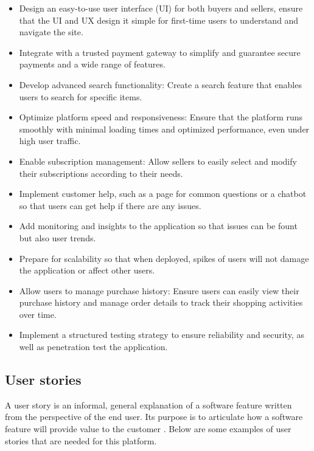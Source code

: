 \documentclass[]{project_report}
\begin{document}
\begin{itemize}
    \item Design an easy-to-use user interface (UI) for both buyers and sellers, ensure that the UI and UX design it simple for first-time users to understand and navigate the site.
    \item Integrate with a trusted payment gateway to simplify and guarantee secure payments and a wide range of features.
    \item Develop advanced search functionality: Create a search feature that enables users to search for specific items.
    \item Optimize platform speed and responsiveness: Ensure that the platform runs smoothly with minimal loading times and optimized performance, even under high user traffic.
    \item Enable subscription management: Allow sellers to easily select and modify their subscriptions according to their needs.
    \item Implement customer help, such as a page for common questions or a chatbot so that users can get help if there are any issues.
    \item Add monitoring and insights to the application so that issues can be fount but also user trends.
    \item Prepare for scalability so that when deployed, spikes of users will not damage the application or affect other users.
    \item Allow users to manage purchase history: Ensure users can easily view their purchase history and manage order details to track their shopping activities over time.
    \item Implement a structured testing strategy to ensure reliability and security, as well as penetration test the application.
\end{itemize}

\subsection{User stories}

A user story is an informal, general explanation of a software feature written from the perspective of the end user. Its purpose is to articulate how a software feature will provide value to the customer \cite{user_stories}. Below are some examples of user stories that are needed for this platform.
\end{document}
